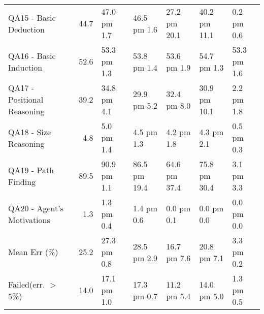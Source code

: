 \begin{tabular}{lrlllll}
 QA15 - Basic Deduction       &   44.7 & 47.0 pm 1.7   & 46.5 pm 1.6  & 27.2 pm 20.1  & 40.2 pm 11.1  & 0.2 pm 0.6                    \\
 QA16 - Basic Induction       &   52.6 & 53.3 pm 1.3   & 53.8 pm 1.4  & 53.6 pm 1.9   & 54.7 pm 1.3   & 53.3 pm 1.6                   \\
 QA17 - Positional Reasoning  &   39.2 & 34.8 pm 4.1   & 29.9 pm 5.2  & 32.4 pm 8.0   & 30.9 pm 10.1  & 2.2 pm 1.8                    \\
 QA18 - Size Reasoning        &    4.8 & 5.0 pm 1.4    & 4.5 pm 1.3   & 4.2 pm 1.8    & 4.3 pm 2.1    & 0.5 pm 0.3                    \\
 QA19 - Path Finding          &   89.5 & 90.9 pm 1.1   & 86.5 pm 19.4 & 64.6 pm 37.4  & 75.8 pm 30.4  & 3.1 pm 3.3                    \\
 QA20 - Agent's Motivations   &    1.3 & 1.3 pm 0.4    & 1.4 pm 0.6   & 0.0 pm 0.1    & 0.0 pm 0.0    & 0.0 pm 0.0                    \\
 Mean Err (\%)                 &   25.2 & 27.3 pm 0.8   & 28.5 pm 2.9  & 16.7 pm 7.6   & 20.8 pm 7.1   & 3.3 pm 0.2                    \\
 Failed(err. \ensuremath{>} 5\%)            &   14.0 & 17.1 pm 1.0   & 17.3 pm 0.7  & 11.2 pm 5.4   & 14.0 pm 5.0   & 1.3 pm 0.5                    \\
\bottomrule
\end{tabular}
